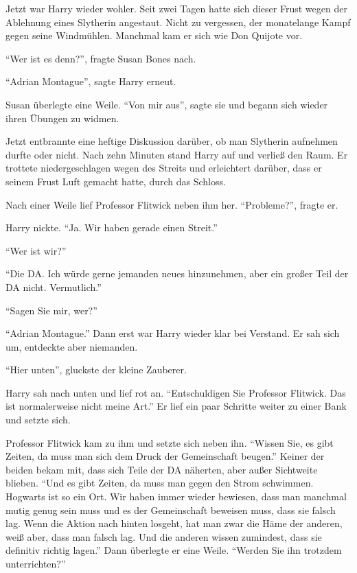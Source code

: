 Jetzt war Harry wieder wohler. Seit zwei Tagen hatte sich dieser Frust wegen der Ablehnung eines Slytherin angestaut. Nicht zu vergessen, der monatelange Kampf gegen seine Windmühlen. Manchmal kam er sich wie Don Quijote vor.

\enquote{Wer ist es denn?}, fragte Susan Bones nach.

\enquote{Adrian Montague}, sagte Harry erneut.

Susan überlegte eine Weile. \enquote{Von mir aus}, sagte sie und begann sich wieder ihren Übungen zu widmen.

Jetzt entbrannte eine heftige Diskussion darüber, ob man Slytherin aufnehmen durfte oder nicht. Nach zehn Minuten stand Harry auf und verließ den Raum. Er trottete niedergeschlagen wegen des Streits und erleichtert darüber, dass er seinem Frust Luft gemacht hatte, durch das Schloss.

Nach einer Weile lief Professor Flitwick neben ihm her. \enquote{Probleme?}, fragte er.

Harry nickte. \enquote{Ja. Wir haben gerade einen Streit.}

\enquote{Wer ist wir?}

\enquote{Die DA. Ich würde gerne jemanden neues hinzunehmen, aber ein großer Teil der DA nicht. Vermutlich.}

\enquote{Sagen Sie mir, wer?}

\enquote{Adrian Montague.} Dann erst war Harry wieder klar bei Verstand. Er sah sich um, entdeckte aber niemanden.

\enquote{Hier unten}, gluckste der kleine Zauberer.

Harry sah nach unten und lief rot an. \enquote{Entschuldigen Sie Professor Flitwick. Das ist normalerweise nicht meine Art.} Er lief ein paar Schritte weiter zu einer Bank und setzte sich.

Professor Flitwick kam zu ihm und setzte sich neben ihn. \enquote{Wissen Sie, es gibt Zeiten, da muss man sich dem Druck der Gemeinschaft beugen.} Keiner der beiden bekam mit, dass sich Teile der DA näherten, aber außer Sichtweite blieben. \enquote{Und es gibt Zeiten, da muss man gegen den Strom schwimmen. Hogwarts ist so ein Ort. Wir haben immer wieder bewiesen, dass man manchmal mutig genug sein muss und es der Gemeinschaft beweisen muss, dass sie falsch lag. Wenn die Aktion nach hinten losgeht, hat man zwar die Häme der anderen, weiß aber, dass man falsch lag. Und die anderen wissen zumindest, dass sie definitiv richtig lagen.} Dann überlegte er eine Weile. \enquote{Werden Sie ihn trotzdem unterrichten?}

